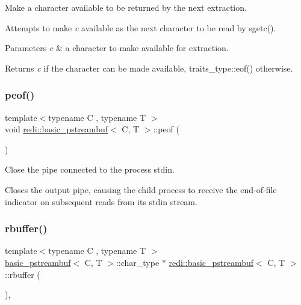 Make a character available to be returned by the next extraction. 

Attempts to make {\itshape c} available as the next character to be read by {\ttfamily sgetc()}.


\begin{DoxyParams}{Parameters}
{\em c} & a character to make available for extraction. \\
\hline
\end{DoxyParams}
\begin{DoxyReturn}{Returns}
{\itshape c} if the character can be made available, {\ttfamily traits\+\_\+type\+::eof()} otherwise. 
\end{DoxyReturn}
\mbox{\label{classredi_1_1basic__pstreambuf_a6937e84719c4eaf08f2a2e514ff98e93}} 
\subsubsection{\texorpdfstring{peof()}{peof()}}
{\footnotesize\ttfamily template$<$typename C , typename T $>$ \\
void \mbox{\hyperlink{classredi_1_1basic__pstreambuf}{redi\+::basic\+\_\+pstreambuf}}$<$ C, T $>$\+::peof (\begin{DoxyParamCaption}{ }\end{DoxyParamCaption})\hspace{0.3cm}{\ttfamily [inline]}}



Close the pipe connected to the process\textquotesingle{} stdin. 

Closes the output pipe, causing the child process to receive the end-\/of-\/file indicator on subsequent reads from its {\ttfamily stdin} stream. \mbox{\label{classredi_1_1basic__pstreambuf_abd8e9fd297080561faf0f74c538cf12d}} 
\subsubsection{\texorpdfstring{rbuffer()}{rbuffer()}}
{\footnotesize\ttfamily template$<$typename C , typename T $>$ \\
\mbox{\hyperlink{classredi_1_1basic__pstreambuf}{basic\+\_\+pstreambuf}}$<$ C, T $>$\+::char\+\_\+type $\ast$ \mbox{\hyperlink{classredi_1_1basic__pstreambuf}{redi\+::basic\+\_\+pstreambuf}}$<$ C, T $>$\+::rbuffer (\begin{DoxyParamCaption}{ }\end{DoxyParamCaption})\hspace{0.3cm}{\ttfamily [inline]}, {\ttfamily [protected]}}



